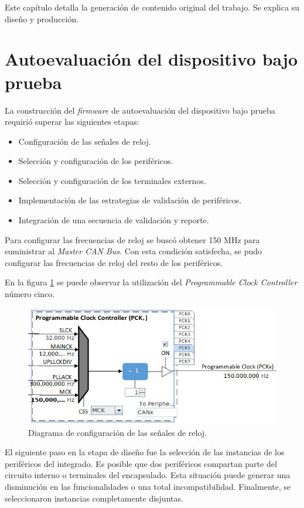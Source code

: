 Este capítulo detalla la generación de contenido original del trabajo.
Se explica su diseño y producción.

\section{Autoevaluación del dispositivo bajo prueba}
\label{sec:autoevaluacion}

La construcción del \emph{firmware} de autoevaluación del dispositivo bajo prueba requirió superar las siguientes etapas:
\begin{itemize}
    \item Configuración de las señales de reloj.
    \item Selección y configuración de los periféricos.
    \item Selección y configuración de los terminales externos.
    \item Implementación de las estrategias de validación de periféricos.
    \item Integración de una secuencia de validación y reporte.
\end{itemize}

Para configurar las frecuencias de reloj se buscó obtener 150 MHz para suministrar al \emph{Master CAN Bus}.
Con esta condición satisfecha, se pudo configurar las frecuencias de reloj del resto de los periféricos.

En la figura \ref{fig:clock} se puede observar la utilización del \emph{Programmable Clock Controller} número cinco.

\begin{figure}[htbp]
	\centering
	\includegraphics[width=\textwidth]{./Figures/Clock.png}
    \caption{Diagrama de configuración de las señales de reloj.}
	\label{fig:clock}
\end{figure}

El siguiente paso en la etapa de diseño fue la selección de las instancias de los periféricos del integrado.
Es posible que dos periféricos compartan parte del circuito interno o terminales del encapsulado.
Esta situación puede generar una disminución en las funcionalidades o una total incompatibilidad.
Finalmente, se seleccionaron instancias completamente disjuntas.

